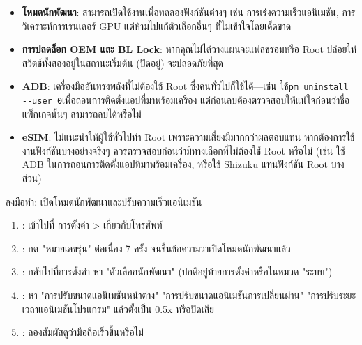\begin{itemize}
  \item \textbf{โหมดนักพัฒนา}: สามารถเปิดใช้งานเพื่อทดลองฟังก์ชันต่างๆ เช่น การเร่งความเร็วแอนิเมชัน, การวิเคราะห์การเรนเดอร์ GPU แต่ห้ามไปแก้ตัวเลือกอื่นๆ ที่ไม่เข้าใจโดยเด็ดขาด
  \item \textbf{การปลดล็อก OEM และ BL Lock}: หากคุณไม่ได้วางแผนจะแฟลชรอมหรือ Root ปล่อยให้สวิตช์ทั้งสองอยู่ในสถานะเริ่มต้น (ปิดอยู่) จะปลอดภัยที่สุด
  \item \textbf{ADB}: เครื่องมืออันทรงพลังที่ไม่ต้องใช้ Root ซึ่งคนทั่วไปก็ใช้ได้—เช่น ใช้\texttt{pm uninstall -\allowbreak -\allowbreak user 0}เพื่อถอนการติดตั้งแอปที่มาพร้อมเครื่อง แต่ก่อนลบต้องตรวจสอบให้แน่ใจก่อนว่าชื่อแพ็กเกจนั้นๆ สามารถลบได้หรือไม่
  \item \textbf{eSIM}: ไม่แนะนำให้ผู้ใช้ทั่วไปทำ Root เพราะความเสี่ยงมีมากกว่าผลตอบแทน หากต้องการใช้งานฟังก์ชันบางอย่างจริงๆ ควรตรวจสอบก่อนว่ามีทางเลือกที่ไม่ต้องใช้ Root หรือไม่ (เช่น ใช้ ADB ในการถอนการติดตั้งแอปที่มาพร้อมเครื่อง, หรือใช้ Shizuku แทนฟังก์ชัน Root บางส่วน)
\end{itemize}

\begin{tcbpractice}{ลงมือทำ: เปิดโหมดนักพัฒนาและปรับความเร็วแอนิเมชัน}
\begin{enumerate}
  \item : เข้าไปที่ การตั้งค่า > เกี่ยวกับโทรศัพท์
  \item : กด "หมายเลขรุ่น" ต่อเนื่อง 7 ครั้ง จนขึ้นข้อความว่าเปิดโหมดนักพัฒนาแล้ว
  \item : กลับไปที่การตั้งค่า หา "ตัวเลือกนักพัฒนา" (ปกติอยู่ท้ายการตั้งค่าหรือในหมวด "ระบบ")
  \item : หา "การปรับขนาดแอนิเมชันหน้าต่าง" "การปรับขนาดแอนิเมชันการเปลี่ยนผ่าน" "การปรับระยะเวลาแอนิเมชันโปรแกรม" แล้วตั้งเป็น 0.5x หรือปิดเสีย
  \item : ลองสัมผัสดูว่ามือถือเร็วขึ้นหรือไม่
\end{enumerate}

\end{tcbpractice}
